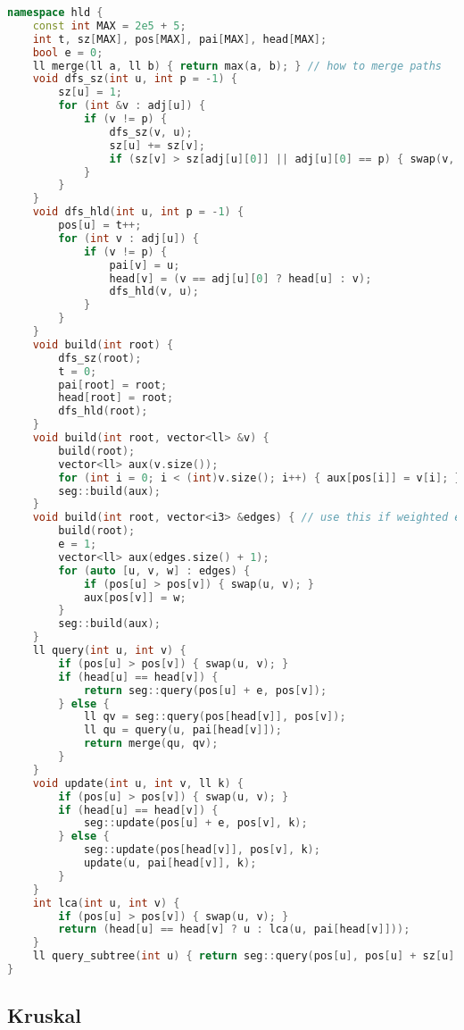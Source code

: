 \documentclass[11pt, a4paper, twoside]{article}
\begin{document}
\begin{lstlisting}[language=C++]
namespace hld {
    const int MAX = 2e5 + 5;
    int t, sz[MAX], pos[MAX], pai[MAX], head[MAX];
    bool e = 0;
    ll merge(ll a, ll b) { return max(a, b); } // how to merge paths
    void dfs_sz(int u, int p = -1) {
        sz[u] = 1;
        for (int &v : adj[u]) {
            if (v != p) {
                dfs_sz(v, u);
                sz[u] += sz[v];
                if (sz[v] > sz[adj[u][0]] || adj[u][0] == p) { swap(v, adj[u][0]); }
            }
        }
    }
    void dfs_hld(int u, int p = -1) {
        pos[u] = t++;
        for (int v : adj[u]) {
            if (v != p) {
                pai[v] = u;
                head[v] = (v == adj[u][0] ? head[u] : v);
                dfs_hld(v, u);
            }
        }
    }
    void build(int root) {
        dfs_sz(root);
        t = 0;
        pai[root] = root;
        head[root] = root;
        dfs_hld(root);
    }
    void build(int root, vector<ll> &v) {
        build(root);
        vector<ll> aux(v.size());
        for (int i = 0; i < (int)v.size(); i++) { aux[pos[i]] = v[i]; }
        seg::build(aux);
    }
    void build(int root, vector<i3> &edges) { // use this if weighted edges
        build(root);
        e = 1;
        vector<ll> aux(edges.size() + 1);
        for (auto [u, v, w] : edges) {
            if (pos[u] > pos[v]) { swap(u, v); }
            aux[pos[v]] = w;
        }
        seg::build(aux);
    }
    ll query(int u, int v) {
        if (pos[u] > pos[v]) { swap(u, v); }
        if (head[u] == head[v]) {
            return seg::query(pos[u] + e, pos[v]);
        } else {
            ll qv = seg::query(pos[head[v]], pos[v]);
            ll qu = query(u, pai[head[v]]);
            return merge(qu, qv);
        }
    }
    void update(int u, int v, ll k) {
        if (pos[u] > pos[v]) { swap(u, v); }
        if (head[u] == head[v]) {
            seg::update(pos[u] + e, pos[v], k);
        } else {
            seg::update(pos[head[v]], pos[v], k);
            update(u, pai[head[v]], k);
        }
    }
    int lca(int u, int v) {
        if (pos[u] > pos[v]) { swap(u, v); }
        return (head[u] == head[v] ? u : lca(u, pai[head[v]]));
    }
    ll query_subtree(int u) { return seg::query(pos[u], pos[u] + sz[u] - 1); }
}
\end{lstlisting}

\subsection{Kruskal}
\end{document}
